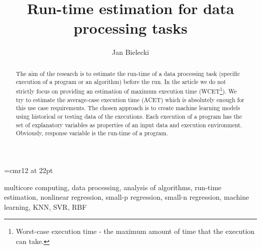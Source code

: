 \documentclass[twocolumn,twoside]{Jornadas}
\begin{document}
\font\myfont=cmr12 at 22pt
\title{\myfont
	Run-time estimation for data processing tasks \\
}

\author{%
     Jan Bielecki%
}

\maketitle
\markboth{}{}
\pagestyle{empty} 
\thispagestyle{empty} %

\begin{abstract}
The aim of the research is to estimate the run-time of a data processing task (specific execution of a program or an algorithm) before the run. In the article we do not strictly focus on providing an estimation of maximum execution time (WCET\footnote{Worst-case execution time - the maximum amount of time that the execution can take.}). We try to estimate the average-case execution time (ACET) which is absolutely enough for this use case requirements. The chosen approach is to create machine learning models using historical or testing data of the executions. Each execution of a program has the set of explanatory variables as properties of an input data and execution environment. Obviously, response variable is the run-time of a program.
\end{abstract}

\begin{keywords}
multicore computing, data processing, analysis of algorithms, run-time estimation, nonlinear regression, small-p regression, small-n regression, machine learning, KNN, SVR, RBF
\end{keywords}











\end{document}
